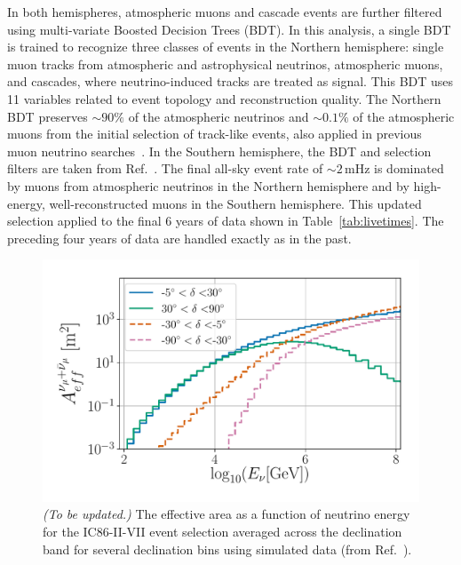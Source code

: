 \documentclass[aps,10pt,prd,twocolumn,floats,letterpaper,showpacs,nofootinbib,bibnotes,notitlepage,superscriptaddress,floatfix]{revtex4-1}
\newcommand{\MA}[1]{{\color{magenta}#1}}
\begin{document}
In both hemispheres, atmospheric muons and cascade events are further filtered using multi-variate Boosted Decision Trees (BDT). In this analysis, a single BDT is trained to recognize three classes of events in the Northern hemisphere: single muon tracks from atmospheric and astrophysical neutrinos, atmospheric muons, and cascades, where neutrino-induced tracks are treated as signal. This BDT uses 11 variables related to event topology and reconstruction quality. The Northern BDT preserves $\sim90\%$ of the atmospheric neutrinos and $\sim0.1\%$ of the atmospheric muons from the initial selection of track-like events, also applied in previous muon neutrino searches~\cite{Aartsen:2016oji,Aartsen:2018ywr}. In the Southern hemisphere, the BDT and selection filters are taken from Ref.~\cite{Aartsen:2016oji}. The final all-sky event rate of $\sim2\,$mHz is dominated by muons from atmospheric neutrinos in the Northern hemisphere and by high-energy, well-reconstructed muons in the Southern hemisphere. This updated selection applied to the final 6 years of data shown in Table~\ref{tab:livetimes}. The preceding four years of data are handled exactly as in the past.

\begin{figure}[t]
\centering
\includegraphics[width=\linewidth]{IC86II_effA.pdf}
\caption[]{\MA{\it (To be updated.)} The effective area as a function of neutrino energy for the IC86-II-VII event selection averaged across the declination band for several declination bins using simulated data (from Ref.~\cite{Aartsen:2019fau}).}\label{fig:effA}
\end{figure}
\end{document}
